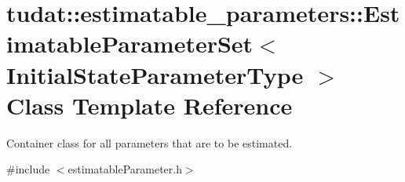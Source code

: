 \hypertarget{classtudat_1_1estimatable__parameters_1_1EstimatableParameterSet}{}\section{tudat\+:\+:estimatable\+\_\+parameters\+:\+:Estimatable\+Parameter\+Set$<$ Initial\+State\+Parameter\+Type $>$ Class Template Reference}
\label{classtudat_1_1estimatable__parameters_1_1EstimatableParameterSet}


Container class for all parameters that are to be estimated.  




{\ttfamily \#include $<$estimatable\+Parameter.\+h$>$}

